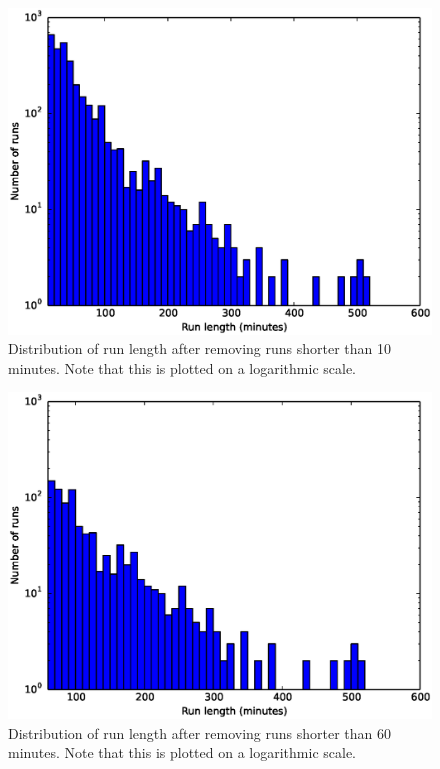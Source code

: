 \begin{figure}[!h]
  \centering
  \includegraphics[width=120mm]{images/hist10-600_log.eps}
  \caption{Distribution of run length after removing runs shorter than 10 minutes. Note that this is plotted on a logarithmic scale.}
  \label{fig:histogram10-600}
\end{figure}

\begin{figure}[!h]
  \centering
  \includegraphics[width=120mm]{images/hist60-600_log.eps}
  \caption{Distribution of run length after removing runs shorter than 60 minutes. Note that this is plotted on a logarithmic scale.}
  \label{fig:histogram60-600}
\end{figure}



